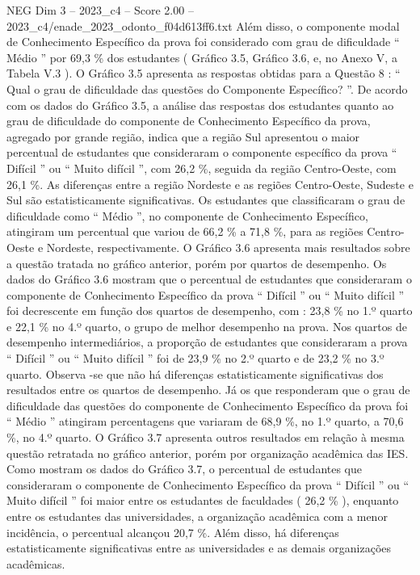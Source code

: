 \begin{textsample}{NEG Dim 3 – 2023\_c4 – Score 2.00 – 2023\_c4/enade\_2023\_odonto\_f04d613ff6.txt}
Além disso, o componente modal de Conhecimento Específico da prova foi considerado com grau de dificuldade “ Médio ” por 69,3 \% dos estudantes ( Gráfico 3.5, Gráfico 3.6, e, no Anexo V, a Tabela V.3 ).
O Gráfico 3.5 apresenta as respostas obtidas para a Questão 8 : “ Qual o grau de dificuldade das questões do Componente Específico? ”.
De acordo com os dados do Gráfico 3.5, a análise das respostas dos estudantes quanto ao grau de dificuldade do componente de Conhecimento Específico da prova, agregado por grande região, indica que a região Sul apresentou o maior percentual de estudantes que consideraram o componente específico da prova “ Difícil ” ou “ Muito difícil ”, com 26,2 \%, seguida da região Centro-Oeste, com 26,1 \%.
As diferenças entre a região Nordeste e as regiões Centro-Oeste, Sudeste e Sul são estatisticamente significativas.
Os estudantes que classificaram o grau de dificuldade como “ Médio ”, no componente de Conhecimento Específico, atingiram um percentual que variou de 66,2 \% a 71,8 \%, para as regiões Centro-Oeste e Nordeste, respectivamente.
O Gráfico 3.6 apresenta mais resultados sobre a questão tratada no gráfico anterior, porém por quartos de desempenho.
Os dados do Gráfico 3.6 mostram que o percentual de estudantes que consideraram o componente de Conhecimento Específico da prova “ Difícil ” ou “ Muito difícil ” foi decrescente em função dos quartos de desempenho, com : 23,8 \% no 1.º quarto e 22,1 \% no 4.º quarto, o grupo de melhor desempenho na prova.
Nos quartos de desempenho intermediários, a proporção de estudantes que consideraram a prova “ Difícil ” ou “ Muito difícil ” foi de 23,9 \% no 2.º quarto e de 23,2 \% no 3.º quarto.
Observa -se que não há diferenças estatisticamente significativas dos resultados entre os quartos de desempenho.
Já os que responderam que o grau de dificuldade das questões do componente de Conhecimento Específico da prova foi “ Médio ” atingiram percentagens que variaram de 68,9 \%, no 1.º quarto, a 70,6 \%, no 4.º quarto.
O Gráfico 3.7 apresenta outros resultados em relação à mesma questão retratada no gráfico anterior, porém por organização acadêmica das IES.
Como mostram os dados do Gráfico 3.7, o percentual de estudantes que consideraram o componente de Conhecimento Específico da prova “ Difícil ” ou “ Muito difícil ” foi maior entre os estudantes de faculdades ( 26,2 \% ), enquanto entre os estudantes das universidades, a organização acadêmica com a menor incidência, o percentual alcançou 20,7 \%.
Além disso, há diferenças estatisticamente significativas entre as universidades e as demais organizações acadêmicas.

\end{textsample}
